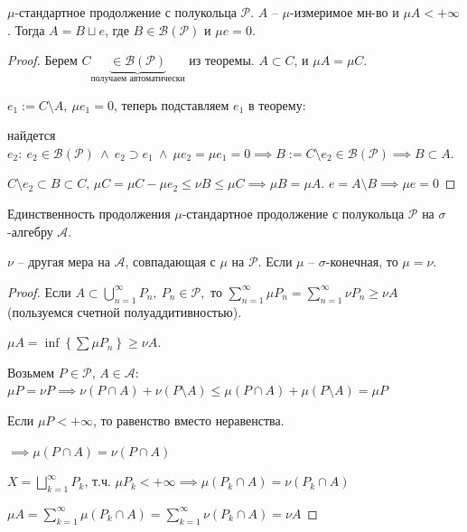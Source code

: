 \begin{consequence}
    $\mu$-стандартное продолжение с полукольца $\mathcal{P}$. $A$ -- $\mu$-измеримое мн-во и $\mu A < +\infty$. Тогда $A = B \sqcup e$, где $B \in \mathcal{B}(\mathcal{P})$ и $\mu e = 0$.
\end{consequence}
\begin{proof}
    Берем $C \underbrace{\in \mathcal{B}(\mathcal{P})}_{\text{получаем автоматически}}$ из теоремы. $A \subset C$, и $\mu A = \mu C$.

    $e_1 := C \setminus A, \ \mu e_1 = 0$, теперь подставляем $e_1$ в теорему: 
    
    найдется $e_2: \ e_2 \in \mathcal{B}(\mathcal{P}) \ \land  \ e_2 \supset e_1 \ \land \ \mu e_2 = \mu e_1 = 0 \implies B := C \setminus e_2 \in \mathcal{B}(\mathcal{P}) \implies B \subset A$.

    $C \setminus e_2 \subset B \subset C$, $\mu C = \mu C - \mu e_2 \leq \nu B \leq \mu C \implies \mu B = \mu A$. $e = A \setminus B \implies \mu e = 0$

\end{proof}

\begin{theorem}
    Единственность продолжения $\mu$-стандартное продолжение с полукольца $\mathcal{P}$ на $\sigma$-алгебру $\mathcal{A}$.

    $\nu$ -- другая мера на $\mathcal{A}$, совпадающая с $\mu$ на $\mathcal{P}$. Если $\mu$ -- $\sigma$-конечная, то $\mu = \nu$.
\end{theorem}

\begin{proof}
    Если $A \subset \bigcup_{n=1}^{\infty} P_n, \ P_n \in \mathcal{P},$ то $\sum_{n=1}^{\infty} \mu P_n = \sum_{n=1}^{\infty} \nu P_n \geq \nu A$ (пользуемся счетной полуаддитивностью).

    $\mu A = \inf \left\{ \sum \mu P_n \right\} \geq \nu A$.

    Возьмем $P \in \mathcal{P}$, $A \in \mathcal{A}$: $\mu P = \nu P \implies \nu (P \cap A) + \nu (P \setminus A) \leq \mu (P \cap A) + \mu (P \setminus A) = \mu P$

    Если $\mu P < + \infty$, то равенство вместо неравенства.

    $\implies \mu (P \cap A) = \nu (P \cap A)$

    $X = \bigsqcup_{k=1}^{\infty} P_k$, т.ч. $\mu P_k < +\infty \implies \mu (P_k \cap A) = \nu (P_k \cap A)$

    $\mu A = \sum_{k=1}^{\infty} \mu (P_k \cap A) = \sum_{k=1}^{\infty} \nu (P_k \cap A) = \nu A$
\end{proof}


